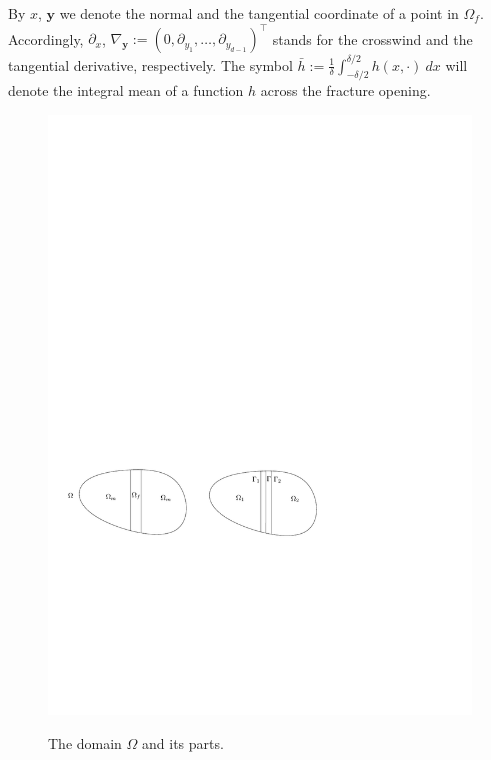 \documentclass[a4paper]{article}
\def\vc#1{\mathbf{\boldsymbol{#1}}}     %
\def\tn#1{{\mathbb{#1}}}    %
\begin{document}
By $x$, $\vc y$ we denote the normal and the tangential coordinate of a point in $\Omega_f$.
Accordingly, $\partial_x$, $\nabla_{\vc y}:=(0,\partial_{y_1},\ldots,\partial_{y_{d-1}})^\top$ stands for the crosswind and the tangential derivative, respectively.
The symbol $\bar h:=\frac1\delta\int_{-\delta/2}^{\delta/2} h(x,\cdot)~dx$ will denote the integral mean of a function $h$ across the fracture opening.


\begin{figure}[h]
\centering
\includegraphics[width=12cm]{figures/domains}
\label{fig:omegas}
\caption{The domain $\Omega$ and its parts.}
\end{figure}
\end{document}
